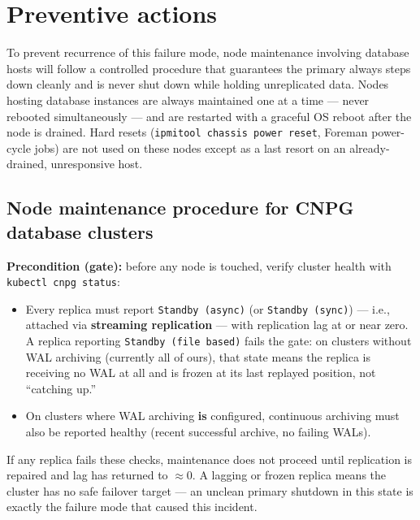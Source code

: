 \documentclass[PMO,authoryear,toc]{lsstdoc}
\begin{document}
\section{Preventive actions}

To prevent recurrence of this failure mode, node maintenance involving
database hosts will follow a controlled procedure that guarantees the primary
always steps down cleanly and is never shut down while holding unreplicated
data. Nodes hosting database instances are always maintained one at a time ---
never rebooted simultaneously --- and are restarted with a graceful OS reboot
after the node is drained. Hard resets (\texttt{ipmitool chassis power reset},
Foreman power-cycle jobs) are not used on these nodes except as a last resort
on an already-drained, unresponsive host.

\subsection{Node maintenance procedure for CNPG database clusters}

\textbf{Precondition (gate):} before any node is touched, verify cluster
health with \texttt{kubectl cnpg status}:

\begin{itemize}
  \item Every replica must report \texttt{Standby (async)} (or
        \texttt{Standby (sync)}) --- i.e., attached via \textbf{streaming
        replication} --- with replication lag at or near zero. A replica
        reporting \texttt{Standby (file based)} fails the gate: on clusters
        without WAL archiving (currently all of ours), that state means the
        replica is receiving no WAL at all and is frozen at its last replayed
        position, not ``catching up.''
  \item On clusters where WAL archiving \textbf{is} configured, continuous
        archiving must also be reported healthy (recent successful archive,
        no failing WALs).
\end{itemize}

If any replica fails these checks, maintenance does not proceed until
replication is repaired and lag has returned to $\approx 0$. A lagging or
frozen replica means the cluster has no safe failover target --- an unclean
primary shutdown in this state is exactly the failure mode that caused this
incident.
\end{document}
